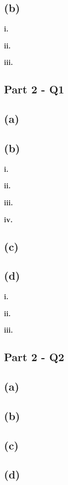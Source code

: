 \documentclass[12pt,a4paper,oneside]{report}
\begin{document}
\subsection*{(b)}

\textbf{i. }

\textbf{ii. }

\textbf{iii. }

\subsection*{Part 2 - Q1}

\subsection*{(a)}

\subsection*{(b)}

\textbf{i. }

\textbf{ii. }

\textbf{iii. }

\textbf{iv. }

\subsection*{(c)}

\subsection*{(d)}

\textbf{i. }

\textbf{ii. }

\textbf{iii. }

\subsection*{Part 2 - Q2}

\subsection*{(a)}

\subsection*{(b)}

\subsection*{(c)}

\subsection*{(d)}
\end{document}
